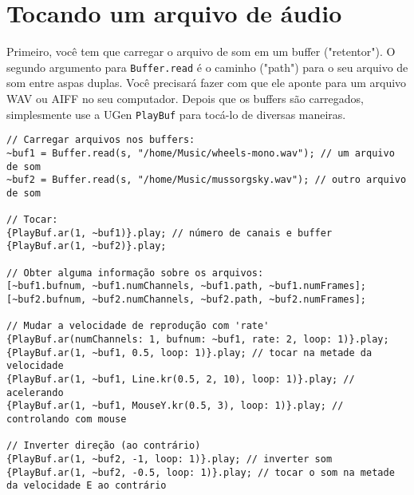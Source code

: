 \section{Tocando um arquivo de áudio}

Primeiro, você tem que carregar o arquivo de som em um buffer ("retentor"). O segundo argumento para \texttt{Buffer.read} é o caminho ("path") para o seu arquivo de som entre aspas duplas. Você precisará fazer com que ele aponte para um arquivo WAV ou AIFF no seu computador. Depois que os buffers são carregados, simplesmente use a UGen \texttt{PlayBuf} para tocá-lo de diversas maneiras.

\bigskip
{}
\bigskip

\begin{lstlisting}[style=SuperCollider-IDE, basicstyle=\scttfamily\footnotesize]
// Carregar arquivos nos buffers:
~buf1 = Buffer.read(s, "/home/Music/wheels-mono.wav"); // um arquivo de som
~buf2 = Buffer.read(s, "/home/Music/mussorgsky.wav"); // outro arquivo de som

// Tocar:
{PlayBuf.ar(1, ~buf1)}.play; // número de canais e buffer
{PlayBuf.ar(1, ~buf2)}.play;

// Obter alguma informação sobre os arquivos:
[~buf1.bufnum, ~buf1.numChannels, ~buf1.path, ~buf1.numFrames];
[~buf2.bufnum, ~buf2.numChannels, ~buf2.path, ~buf2.numFrames];

// Mudar a velocidade de reprodução com 'rate' 
{PlayBuf.ar(numChannels: 1, bufnum: ~buf1, rate: 2, loop: 1)}.play;
{PlayBuf.ar(1, ~buf1, 0.5, loop: 1)}.play; // tocar na metade da velocidade
{PlayBuf.ar(1, ~buf1, Line.kr(0.5, 2, 10), loop: 1)}.play; // acelerando
{PlayBuf.ar(1, ~buf1, MouseY.kr(0.5, 3), loop: 1)}.play; // controlando com mouse

// Inverter direção (ao contrário)
{PlayBuf.ar(1, ~buf2, -1, loop: 1)}.play; // inverter som
{PlayBuf.ar(1, ~buf2, -0.5, loop: 1)}.play; // tocar o som na metade da velocidade E ao contrário
\end{lstlisting}
